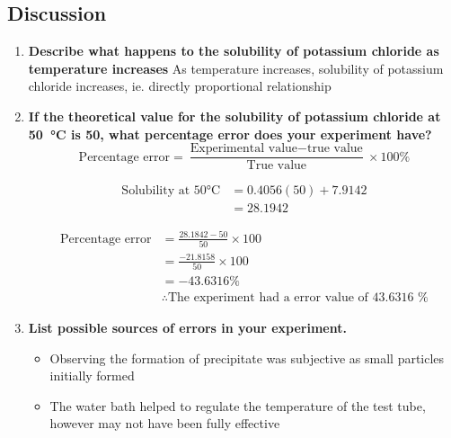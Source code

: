 	\subsection{Discussion}
		\begin{enumerate}
			\item \textbf{Describe what happens to the solubility of potassium chloride as temperature increases}
				\subitem As temperature increases, solubility of potassium chloride increases, ie. directly proportional relationship
			\item \textbf{If the theoretical value for the solubility of potassium chloride at \qty{50}{\degreeCelsius} is \qty{50}{\solub}, what percentage error does your experiment have?}
			$$\text{Percentage error} = \frac{\text{Experimental value} - \text{true value}}{\text{True value}} \times 100\%$$

			\begin{align*}
				\text{Solubility at 50} \unit{\degreeCelsius} &= 0.4056(50) + 7.9142 \\
				&= 28.1942
			\end{align*}

			\begin{align*}
				\text{Percentage error} &= \frac{28.1842 - 50}{50} \times 100 \\
				&= \frac{-21.8158}{50} \times 100 \\
				&= -43.6316 \% \\
				&\therefore \text{The experiment had a error value of 43.6316 \%}
			\end{align*}
			
			\item \textbf{List possible sources of errors in your experiment.}
				\begin{itemize}
					\item Observing the formation of precipitate was subjective as small particles initially formed
					\item The water bath helped to regulate the temperature of the test tube, however may not have been fully effective
				\end{itemize}
		\end{enumerate}